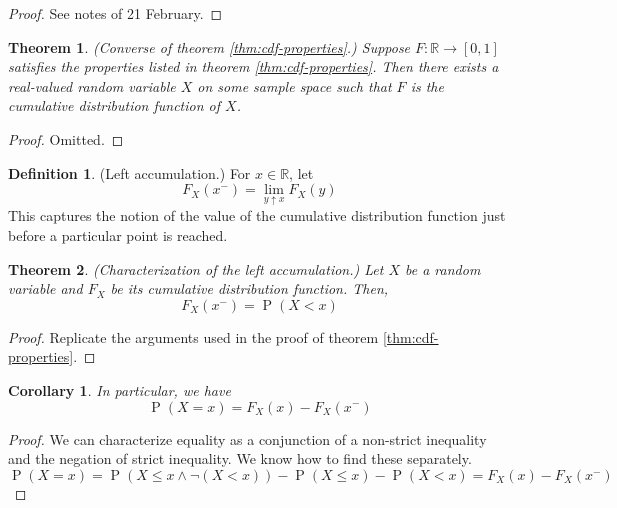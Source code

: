 \documentclass[11pt]{article}
\newtheorem{thm}{Theorem}
\newtheorem{cor}{Corollary}
\theoremstyle{definition}
\newtheorem{defn}{Definition}[section]
\theoremstyle{remark}
\newcommand{\omittedproof}{%
    \begin{proof}
        Omitted.
    \end{proof}
}
\newcommand{\parens}[1]{\left(#1\right)}
\newcommand{\upto}{\mathbin{\uparrow}}
\newcommand{\fromleft}{^-}
\newcommand{\R}{\mathbb{R}}
\newcommand{\unit}{[0,1]}
\DeclareMathOperator{\Prob}{P}
\renewcommand{\P}[1]{\Prob{\parens{#1}}}
\newcommand{\cdf}{cumulative distribution function}
\begin{document}
\begin{proof}
    See notes of 21 February.
\end{proof}

\begin{thm}{(Converse of theorem \ref{thm:cdf-properties}.)}
    \label{thm:cdf-properties-converse}
    Suppose $F : \R \to \unit$ satisfies the properties listed in theorem
    \ref{thm:cdf-properties}. Then there exists a real-valued random variable
    $X$ on some sample space such that $F$ is the \cdf{} of $X$.
\end{thm}

\omittedproof

\begin{defn}{(Left accumulation.)}
    \label{def:left-acc}
    For $x \in \R$, let
    \begin{equation}
        \label{eq:left-acc}
        F_X (x\fromleft) = \lim_{y \upto x} {
            F_X (y)
        }
    \end{equation}
    This captures the notion of the value of the \cdf{} just before a
    particular point is reached.
\end{defn}

\begin{thm}{(Characterization of the left accumulation.)}
    \label{thm:characterization-left-acc}
    Let $X$ be a random variable and $F_X$ be its \cdf.
    Then,
    \begin{equation}
        \label{eq:left-acc-strict-inequality}
        F_X(x\fromleft) = \P{X < x}
    \end{equation}
\end{thm}

\begin{proof}
    Replicate the arguments used in the proof of theorem
    \ref{thm:cdf-properties}.
\end{proof}

\begin{cor}
    In particular, we have
    \begin{equation}
        \label{eq:left-acc-equality}
        \P{X = x} = F_X (x) - F_X(x\fromleft)
    \end{equation}
\end{cor}

\begin{proof}
    We can characterize equality as a conjunction of a non-strict inequality
    and the negation of strict inequality. We know how to find these
    separately.
    \begin{equation*}
        \P{X = x}
        = \P{X \leq x \land \neg \parens{X < x}}
        - \P{X \leq x} - \P{X < x}
        = F_X(x) - F_X(x\fromleft)
    \end{equation*}
\end{proof}
\end{document}
